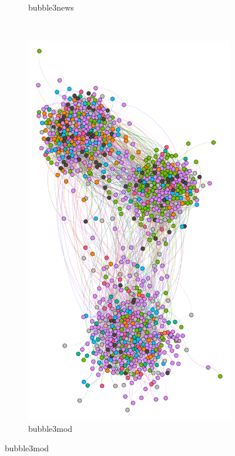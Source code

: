 \begin{figure}
\begin{subfigure}[t]{0.35\textwidth}
    \caption{bubble3news}
    \label{fig:bubble7mod}
  \end{subfigure}
  \\
  \begin{subfigure}[t]{0.25\textwidth}
    \includegraphics[width=\textwidth]{img/dim3_news.pdf}
    \caption{bubble3mod}
    \label{fig:bubble3news}
  \end{subfigure}

\end{figure}
